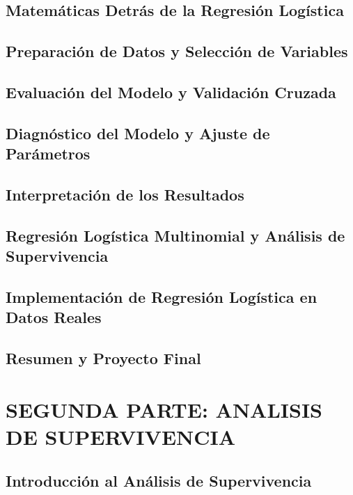 \documentclass{report}
\begin{document}
\chapter{Matemáticas Detrás de la Regresión Logística}


\chapter{Preparación de Datos y Selección de Variables}


\chapter{Evaluación del Modelo y Validación Cruzada}


\chapter{Diagnóstico del Modelo y Ajuste de Parámetros}


\chapter{Interpretación de los Resultados}


\chapter{Regresión Logística Multinomial y Análisis de Supervivencia}


\chapter{Implementación de Regresión Logística en Datos Reales}


\chapter{Resumen y Proyecto Final}


\part{SEGUNDA PARTE: ANALISIS DE SUPERVIVENCIA}

\chapter{Introducción al Análisis de Supervivencia}

\end{document}
